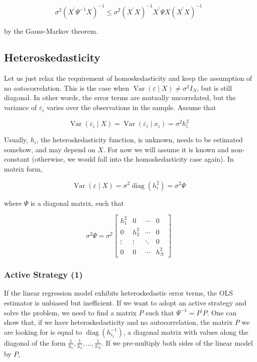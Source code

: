 $$
\sigma^{2}\left(X^{\prime} \Psi^{-1} X\right)^{-1} \leq \sigma^{2}\left(X^{\prime} X\right)^{-1} X^{\prime} \Psi X\left(X^{\prime} X\right)^{-1}
$$

by the Gauss-Markov theorem.

\subsection{Heteroskedasticity}
Let us just relax the requirement of homoskedasticity and keep the assumption of no autocorrelation. This is the case when $\operatorname{Var}(\varepsilon \mid X) \neq \sigma^{2} I_{N}$, but is still diagonal. In other words, the error terms are mutually uncorrelated, but the variance of $\varepsilon_{i}$ varies over the observations in the sample. Assume that

$$
\operatorname{Var}\left(\varepsilon_{i} \mid X\right)=\operatorname{Var}\left(\varepsilon_{i} \mid x_{i}\right)=\sigma^{2} h_{i}^{2}
$$

Usually, $h_{i}$, the heteroskedasticity function, is unknown, needs to be estimated somehow, and may depend on $X$. For now we will assume it is known and non-constant (otherwise, we would fall into the homoskedasticity case again). In matrix form,

$$
\operatorname{Var}(\varepsilon \mid X)=\sigma^{2} \operatorname{diag}\left(h_{i}^{2}\right)=\sigma^{2} \Psi
$$

where $\Psi$ is a diagonal matrix, such that

$$
\sigma^{2} \Psi=\sigma^{2}\left[\begin{array}{cccc}
h_{1}^{2} & 0 & \cdots & 0 \\
0 & h_{2}^{2} & \cdots & 0 \\
\vdots & \vdots & \ddots & 0 \\
0 & 0 & \cdots & h_{N}^{2}
\end{array}\right]
$$

\subsubsection{Active Strategy (1)}
If the linear regression model exhibits heteroskedastic error terms, the OLS estimator is unbiased but inefficient. If we want to adopt an active strategy and solve the problem, we need to find a matrix $P$ such that $\Psi^{-1}=P^{\prime} P$. One can show that, if we have heteroskedasticity and no autocorrelation, the matrix $P$ we are looking for is equal to $\operatorname{diag}\left(h_{i_{1}}^{-1}\right)$, a diagonal matrix with values along the diagonal of the form $\frac{1}{h_{1}}, \frac{1}{h_{2}}, \ldots, \frac{1}{h_{N}}$. If we pre-multiply both sides of the linear model by $P$,

